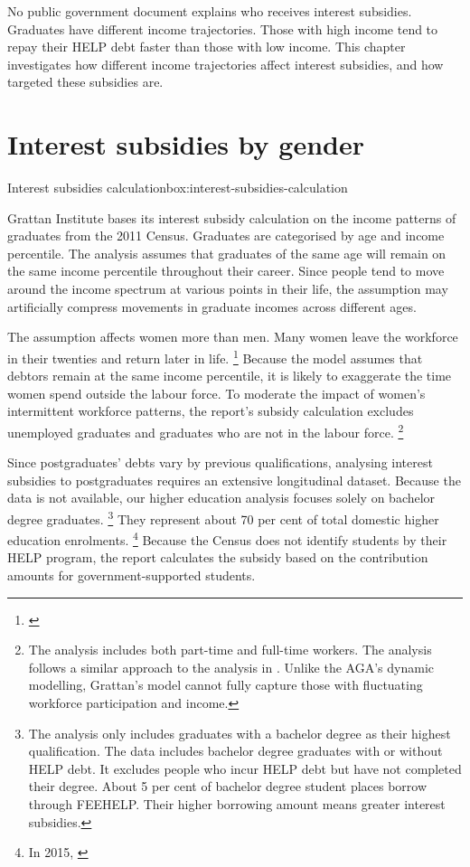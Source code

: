 \documentclass[embargoed]{grattan}
\begin{document}
No public government document explains who receives interest subsidies.
Graduates have different income trajectories.
Those with high income tend to repay their \gls{HELP} debt faster than those with low income.
This chapter investigates how different income trajectories affect interest subsidies, and how targeted these subsidies are.

\section{Interest subsidies by gender}\label{sec:interest-subsidies-by-gender}

\begin{bigbox*}{Interest subsidies calculation}{box:interest-subsidies-calculation}

Grattan Institute bases its interest subsidy calculation on the income patterns of graduates from the 2011 Census.
Graduates are categorised by age and income percentile.
The analysis assumes that graduates of the same age will remain on the same income percentile throughout their career.
Since people tend to move around the income spectrum at various points in their life, the assumption may artificially compress movements in graduate incomes across different ages.

The assumption affects women more than men.
Many women leave the workforce in their twenties and return later in life.%
\footnote{\textcite[][figure 9]{Norton2016HELPfuturefairer}} Because the model assumes that debtors remain at the same income percentile, it is likely to exaggerate the time women spend outside the labour force.
To moderate the impact of women's intermittent workforce patterns, the report's subsidy calculation excludes unemployed graduates and graduates who are not in the labour force.%
\footnote{The analysis includes both part-time and full-time workers.
The analysis follows a similar approach to the analysis in \textcite[][p. 7-8]{Chapman2014InquiryprovisionsHigher}.
Unlike the \gls{AGA}'s dynamic modelling, Grattan's model cannot fully capture those with fluctuating workforce participation and income.}

Since postgraduates' debts vary by previous qualifications, analysing interest subsidies to postgraduates requires an extensive longitudinal dataset.
Because the data is not available, our higher education analysis focuses solely on bachelor degree graduates.%
\footnote{The analysis only includes graduates with a bachelor degree as their highest qualification.
The data includes bachelor degree graduates with or without \gls{HELP} debt.
It excludes people who incur \gls{HELP} debt but have not completed their degree.
About 5 per cent of bachelor degree student places borrow through \gls{FEEHELP}.
Their higher borrowing amount means greater interest subsidies.} They represent about 70 per cent of total domestic higher education enrolments.%
\footnote{In 2015, \textcite[][section 2, table 2.6]{Education2016StudentsSelectedhigher}} Because the Census does not identify students by their \gls{HELP} program, the report calculates the subsidy based on the contribution amounts for government-supported students.
\end{bigbox*}
\end{document}
